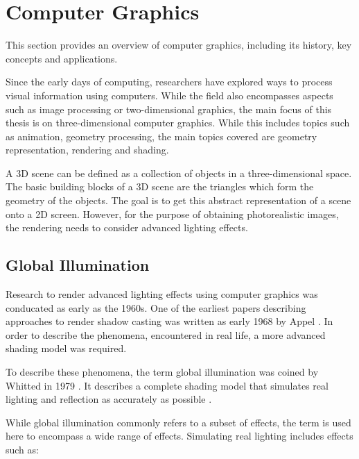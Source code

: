 \section{Computer Graphics}
\label{ch:computerGraphics}

This section provides an overview of computer graphics, including its history, key concepts and applications.

Since the early days of computing, researchers have explored ways to process visual information using computers. While the field also encompasses aspects such as image processing or two-dimensional graphics, the main focus of this thesis is on three-dimensional computer graphics. While this includes topics such as animation, geometry processing, the main topics covered are geometry representation, rendering and shading.

A 3D scene can be defined as a collection of objects in a three-dimensional space. The basic building blocks of a 3D scene are the triangles which form the geometry of the objects. The goal is to get this abstract representation of a scene onto a 2D screen. However, for the purpose of obtaining photorealistic images, the rendering needs to consider advanced lighting effects.

\subsection{Global Illumination}

Research to render advanced lighting effects using computer graphics was conducated as early as the 1960s. One of the earliest papers describing approaches to render shadow casting was written as early 1968 by Appel \cite{appel1968shading}. In order to describe the phenomena, encountered in real life, a more advanced shading model was required.

To describe these phenomena, the term global illumination was coined by Whitted in 1979 \cite{whittedGlobalIllumination}. It describes a complete shading model that simulates real lighting and reflection as accurately as possible \cite{whitted2020OriginsOfGlobalIllumination}. 

While global illumination commonly refers to a subset of effects, the term is used here to encompass a wide range of effects. Simulating real lighting includes effects such as:

